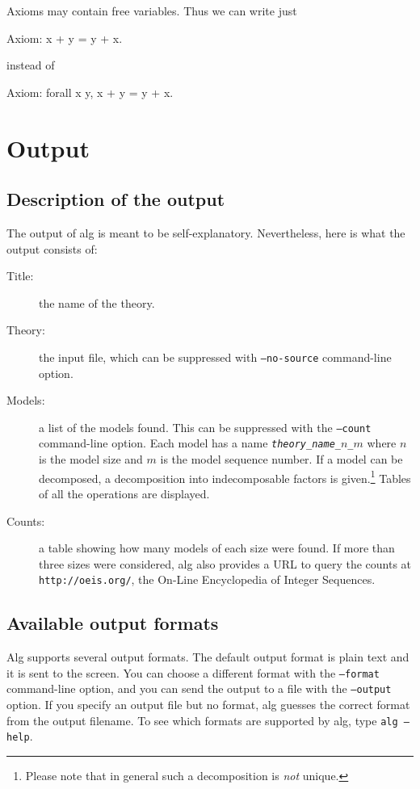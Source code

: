 \documentclass{article}
\begin{document}
Axioms may contain free variables. Thus we can write just
%
\begin{alg}
Axiom: x + y = y + x.
\end{alg}
%
instead of
\begin{alg}
Axiom: forall x y, x + y = y + x.
\end{alg}
%

\section{Output}
\label{sec:output-files}

\subsection{Description of the output}
\label{sec:description-output}

The output of alg is meant to be self-explanatory. Nevertheless, here
is what the output consists of:
%
\begin{description}
\item[Title:] the name of the theory.
\item[Theory:] the input file, which can be suppressed with %
  \texttt{--no-source} command-line option.
\item[Models:] a list of the models found. This can be
  suppressed with the \texttt{--count} command-line option. Each model
  has a name \texttt{\textit{theory\_name\_$n$\_$m$}}
  where $n$ is the model size and $m$ is the model sequence number. If
  a model can be decomposed, a decomposition into indecomposable
  factors is given.\footnote{Please note that in general such a
    decomposition is \emph{not} unique.} Tables of all the operations
  are displayed.
\item[Counts:] a table showing how many models of each size were found.
  If more than three sizes were considered, alg also provides a URL to
  query the counts at \texttt{http://oeis.org/}, the On-Line
  Encyclopedia of Integer Sequences.
\end{description}

\subsection{Available output formats}
\label{sec:output-formats}

Alg supports several output formats. The default output format is
plain text and it is sent to the screen. You can choose a different
format with the \texttt{--format} command-line option, and you can
send the output to a file with the \texttt{--output} option. If you
specify an output file but no format, alg guesses the correct format
from the output filename. To see which formats are supported by alg,
type \texttt{alg --help}.
\end{document}
